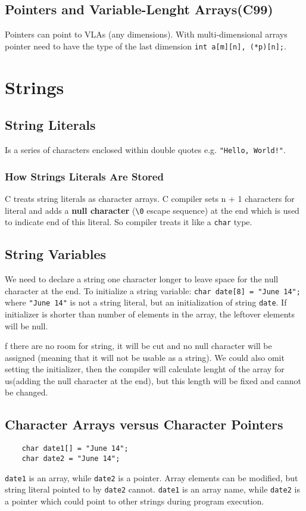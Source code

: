 \documentclass[openany]{book}
\begin{document}
    \section{Pointers and Variable-Lenght Arrays(C99)}
    Pointers can point to VLAs (any dimensions). With multi-dimensional arrays pointer need to have the type of
    the last dimension \texttt{int a[m][n], (*p)[n];}.

    \chapter{Strings}

    \section{String Literals}
    Is a series of characters enclosed within double quotes e.g. \texttt{"Hello, World!"}.

    \subsection*{How Strings Literals Are Stored}
    C treats string literals as character arrays. C compiler sets n + 1 characters for literal
    and adds a \textbf{null character} (\texttt{\textbackslash 0} escape sequence) at the end which is used
    to indicate end of this literal. So compiler treats it like a \texttt{char} type.

    \section{String Variables}
    We need to declare a string one character longer to leave space for the null character at the
    end. To initialize a string variable: \texttt{char date[8] = "June 14";} where \texttt{"June 14"}
    is not a string literal, but an initialization of string \texttt{date}. If initializer is shorter
    than number of elements in the array, the leftover elements will be null.

    f there are no room for string, it will be cut and no null character will be assigned (meaning
    that it will not be usable as a string). We could also omit setting the initializer, then the
    compiler will calculate lenght of the array for us(adding the null character at the end), but
    this length will be fixed and cannot be changed.

    \section{Character Arrays versus Character Pointers}
    \begin{lstlisting}
    char date1[] = "June 14";
    char date2 = "June 14";
    \end{lstlisting}
    \texttt{date1} is an array, while \texttt{date2} is a pointer. Array elements can be modified,
    but string literal pointed to by \texttt{date2} cannot. \texttt{date1} is an array name, while
    \texttt{date2} is a pointer which could point to other strings during program execution.
\end{document}
